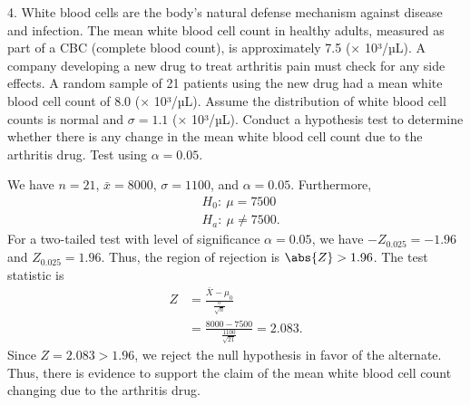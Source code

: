 \documentclass{report}
\begin{document}
\pagebreak \bigbreak \noindent 
\begin{mdframed}
4. White blood cells are the body’s natural defense mechanism against disease and infection. The mean white blood cell count in healthy adults, measured as part of a CBC (complete blood count), is approximately 7.5 (× 10³/µL). A company developing a new drug to treat arthritis pain must check for any side effects. A random sample of 21 patients using the new drug had a mean white blood cell count of 8.0 (× 10³/µL). Assume the distribution of white blood cell counts is normal and \(\sigma = 1.1 \) (× 10³/µL). Conduct a hypothesis test to determine whether there is any change in the mean white blood cell count due to the arthritis drug. Test using \(\alpha = 0.05\).
\end{mdframed}
\bigbreak \noindent 
We have $n=21$, $\bar{x} = 8000$, $\sigma=1100$, and $\alpha = 0.05$. Furthermore, 
\begin{align*}
    &H_{0}:\ \mu = 7500 \\
    &H_{a}:\ \mu \ne 7500
.\end{align*}
\bigbreak \noindent 
For a two-tailed test with level of significance $\alpha = 0.05$, we have $-Z_{0.025} = -1.96$ and $Z_{0.025} = 1.96$. Thus, the region of rejection is $\abs{Z} > 1.96$. The test statistic is
\begin{align*}
    Z &= \frac{\bar{X} - \mu_{0}}{\frac{\sigma}{\sqrt{n}}} \\
    &=\frac{8000-7500}{\frac{1100}{\sqrt{21}}} = 2.083
.\end{align*}
\bigbreak \noindent 
Since $Z = 2.083 > 1.96$, we reject the null hypothesis in favor of the alternate. Thus, there is evidence to support the claim of the mean white blood cell count changing due to the arthritis drug.
\end{document}
